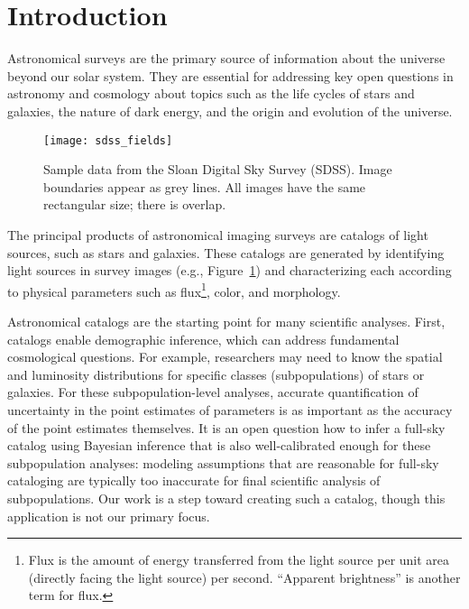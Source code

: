 \section{Introduction}
\label{sec:intro}
Astronomical surveys are the primary source of information about the universe beyond our solar system. They are essential for addressing key open questions in astronomy and cosmology about topics such as the life cycles of stars and galaxies, the nature of dark energy, and the origin and evolution of the universe.

\begin{figure}[hb]
\centering
\texttt{[image: sdss\_fields]}
\caption{Sample data from the Sloan Digital Sky Survey (SDSS). Image boundaries appear as grey lines. All images have the same rectangular size; there is overlap.}
\label{fig:sdss_fields}
\end{figure}

The principal products of astronomical imaging surveys are catalogs of light sources, such as stars and galaxies.
These catalogs are generated by identifying light sources in survey images (e.g., Figure~\ref{fig:sdss_fields}) and characterizing each according to physical parameters such as flux\footnote{Flux is the amount of energy transferred from the light source per unit area (directly facing the light source) per second. ``Apparent brightness'' is another term for flux.}, color, and morphology.

Astronomical catalogs are the starting point for many scientific analyses.
First, catalogs enable demographic inference, which can address fundamental cosmological questions.
For example, researchers may need to know the spatial and luminosity distributions for specific classes (subpopulations) of stars or galaxies.
For these subpopulation-level analyses, accurate quantification of uncertainty in the point estimates of parameters is as important as the accuracy of the point estimates themselves.
It is an open question how to infer a full-sky catalog using Bayesian inference that is also well-calibrated enough for these subpopulation analyses: modeling assumptions that are reasonable for full-sky cataloging are typically too inaccurate for final scientific analysis of subpopulations.
Our work is a step toward creating such a catalog, though this application is not our primary focus.

